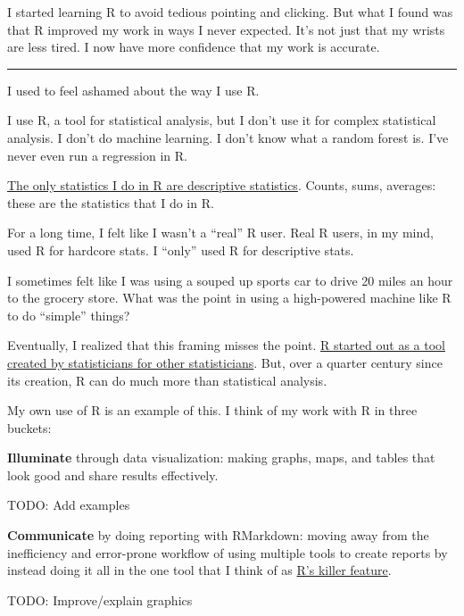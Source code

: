 \documentclass[
]{book}
\begin{document}
I started learning R to avoid tedious pointing and clicking. But what I found was that R improved my work in ways I never expected. It's not just that my wrists are less tired. I now have more confidence that my work is accurate.

\begin{center}\rule{0.5\linewidth}{0.5pt}\end{center}

I used to feel ashamed about the way I use R.

I use R, a tool for statistical analysis, but I don't use it for complex statistical analysis. I don't do machine learning. I don't know what a random forest is. I've never even run a regression in R.

\href{https://rfortherestofus.com/2018/12/descriptive-stats-r/}{The only statistics I do in R are descriptive statistics}. Counts, sums, averages: these are the statistics that I do in R.

For a long time, I felt like I wasn't a ``real'' R user. Real R users, in my mind, used R for hardcore stats. I ``only'' used R for descriptive stats.

I sometimes felt like I was using a souped up sports car to drive 20 miles an hour to the grocery store. What was the point in using a high-powered machine like R to do ``simple'' things?

Eventually, I realized that this framing misses the point. \href{https://rss.onlinelibrary.wiley.com/doi/10.1111/j.1740-9713.2018.01169.x}{R started out as a tool created by statisticians for other statisticians}. But, over a quarter century since its creation, R can do much more than statistical analysis.

My own use of R is an example of this. I think of my work with R in three buckets:

\textbf{Illuminate} through data visualization: making graphs, maps, and tables that look good and share results effectively.

TODO: Add examples

\textbf{Communicate} by doing reporting with RMarkdown: moving away from the inefficiency and error-prone workflow of using multiple tools to create reports by instead doing it all in the one tool that I think of as \href{https://rfortherestofus.com/2019/03/r-killer-feature-rmarkdown/}{R's killer feature}.

TODO: Improve/explain graphics
\end{document}
